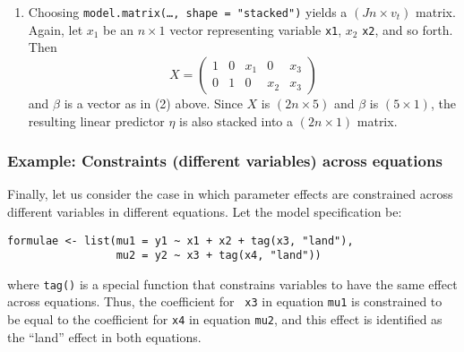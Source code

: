 \documentclass[oneside,letterpaper,12pt]{article}
\begin{document}
\begin{enumerate}
\item Choosing {\tt model.matrix(\dots, shape = "stacked")} yields a
$(Jn \times v_t)$ matrix.  Again, let $x_1$ be an $n \times 1$ vector
representing variable {\tt x1}, $x_2$ {\tt x2}, and so forth.  Then
\begin{equation*}
X = \left (\begin{array}{ccccc}
1 & 0 & x_1 & 0 & x_3  \\ 
0 & 1 & 0   & x_2   & x_3 
\end{array} \right) 
\end{equation*}
and $\beta$ is a vector as in (2) above.  Since $X$ is $(2n \times 5)$
and $\beta$ is $(5 \times 1)$, the resulting linear predictor $\eta$
is also stacked into a $(2n \times 1)$ matrix.  
\end{enumerate}

\subsubsection{Example:  Constraints (different variables) across equations}

Finally, let us consider the case in which parameter effects are
constrained across different variables in different equations.  Let
the model specification be:
\begin{verbatim}
formulae <- list(mu1 = y1 ~ x1 + x2 + tag(x3, "land"), 
                 mu2 = y2 ~ x3 + tag(x4, "land"))
\end{verbatim}
where {\tt tag()} is a special function that constrains variables to
have the same effect across equations.  Thus, the coefficient for {\tt
x3} in equation {\tt mu1} is constrained to be equal to the
coefficient for {\tt x4} in equation {\tt mu2}, and this effect is
identified as the ``land'' effect in both equations.  
\end{document}
